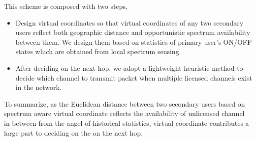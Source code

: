 This scheme is composed with two steps,
\begin{itemize}
\item Design virtual coordinates so that virtual coordinates of any two secondary users reflect both geographic distance and opportunistic spectrum availability between them.
We design them based on statistics of primary user’s ON/OFF states which are obtained from local spectrum sensing.

\item After deciding on the next hop, we adopt a lightweight heuristic method to decide which channel to transmit packet when multiple licensed channels exist in the network.


\end{itemize}

To summarize, as the Euclidean distance between two secondary users based on spectrum aware virtual coordinate reflects the availability of unlicensed channel in between from the angel of historical statistics, virtual coordinate contributes a large part to deciding on the on the next hop. 



